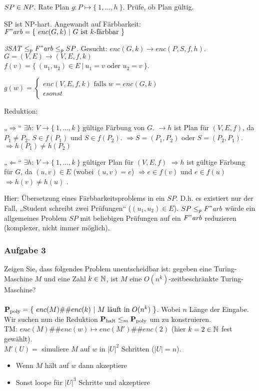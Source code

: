     $SP \in \mathit{NP}$. Rate Plan $g: P \mapsto \{\ 1, \dots, h\ \}$. Prüfe, ob Plan gültig.

    SP ist NP-hart. Angewandt auf Färbbarkeit: $\mathit{F"arb} = \{\ enc(G, k)\ |\ G \text{ ist $k$-färbbar } \}$

    $\mathit{3SAT} \leq_{p} \mathit{F"arb} \leq_{p} SP$. Gesucht: $enc(G,k) \to enc(P,S,f,h)$. $G = (V,E) \to (V,E,f,k)$ \\
    $f(v) = \{\ (u_{1}, u_{2}) \in E\ |\ u_{1} = v \text{ oder } u_{2} = v\ \}$.

    $g(w) =
    \begin{cases}
        enc(V,E,f,k) \text{ falls } w = enc(G,k) \\
        \epsilon sonst
    \end{cases}$

    Reduktion: 

    „$\Rightarrow$“ $\exists h$: $V \to \{\ 1, \dots, k\ \}$ gültige Färbung von $G$. $\to h$ ist Plan für $(V,E,f)$, da $P_{1} \neq P_{2}$. $S \in f(P_{1})$ und $S \in f(P_{2})$. $\Rightarrow S = (P_{1}, P_{2})$ oder $S=(P_{2}, P_{1})$. $\Rightarrow h(P_{1}) \neq h(P_{2})$

    „$\Leftarrow$“ $\exists h$: $V \to \{\ 1, \dots, k\ \}$ gültiger Plan für $(V,E,f)$ $\Rightarrow h$ ist gültige Färbung für $G$, da $(u,v) \in E$ (wobei $(u,v) = e$)
        $\Rightarrow e \in f(v)$ und $e \in f(u)$ $\Rightarrow h(v) \neq h(u)$ .

    Hier: Übersetzung eines Färbbarkeitsproblems in ein $SP$. D.h. es existiert nur der Fall, „Student schreibt zwei Prüfungen“ ($(u_{1}, u_{2}) \in E$).
    $SP \leq_{p} \mathit{F"arb}$ würde ein allgemeines Problem $SP$ mit beliebigen Prüfungen auf ein $\mathit{F"arb}$ reduzieren (komplexer, nicht immer möglich).


\subsubsection*{Aufgabe 3}
    Zeigen Sie, dass folgendes Problem unentscheidbar ist: gegeben eine Turing-Maschine $M$ und eine Zahl $k \in \mathbb{N}$, ist $M$ eine $O(n^{k})$-zeitbeschränkte Turing-Maschine? \\

    \LOES \\
    $\textbf{P}_{\text{poly}} = \{\ enc(M) \#\# enc(k)\ |\ M \text{ läuft in } O(n^{k})\ \}$. Wobei $n$ Länge der Eingabe.\\
    Wir suchen nun die Reduktion $\textbf{P}_{\text{halt}} \leq_{m} \textbf{P}_{\text{poly}}$ um  zu konstruieren. \\
    TM: $enc(M) \#\# enc(w) \mapsto enc(M') \#\# enc(2)$ (hier $k = 2 \in \mathbb{N}$ fest gewählt). \\

    $M'(U) = $ simuliere $M$ auf $w$ in $|U|^{2}$ Schritten ($|U| = n$).
    \begin{itemize}
        \item Wenn $M$ hält auf $w$ dann akzeptiere
        \item Sonst loope für $|U|^{3}$ Schritte und akzeptiere
    \end{itemize}
